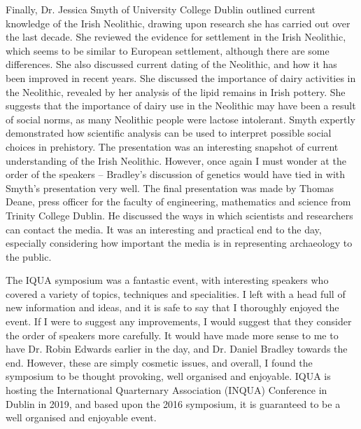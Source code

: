 \documentclass[%
	]{ijsra}
\begin{document}
Finally, Dr. Jessica Smyth of University College Dublin outlined current knowledge of the Irish Neolithic, drawing upon research she has carried out over the last decade. She reviewed the evidence for settlement in the Irish Neolithic, which seems to be similar to European settlement, although there are some differences. She also discussed current dating of the Neolithic, and how it has been improved in recent years. She discussed the importance of dairy activities in the Neolithic, revealed by her analysis of the lipid remains in Irish pottery. She suggests that the importance of dairy use in the Neolithic may have been a result of social norms, as many Neolithic people were lactose intolerant. Smyth expertly demonstrated how scientific analysis can be used to interpret possible social choices in prehistory. The presentation was an interesting snapshot of current understanding of the Irish Neolithic. However, once again I must wonder at the order of the speakers – Bradley’s discussion of genetics would have tied in with Smyth’s presentation very well. 
The final presentation was made by Thomas Deane, press officer for the faculty of engineering, mathematics and science from Trinity College Dublin. He discussed the ways in which scientists and researchers can contact the media. It was an interesting and practical end to the day, especially considering how important the media is in representing archaeology to the public. 

The IQUA symposium was a fantastic event, with interesting speakers who covered a variety of topics, techniques and specialities. I left with a head full of new information and ideas, and it is safe to say that I thoroughly enjoyed the event. If I were to suggest any improvements, I would suggest that they consider the order of speakers more carefully. It would have made more sense to me to have Dr. Robin Edwards earlier in the day, and Dr. Daniel Bradley towards the end. However, these are simply cosmetic issues, and overall, I found the symposium to be thought provoking, well organised and enjoyable. IQUA is hosting the International Quarternary Association (INQUA) Conference in Dublin in 2019, and based upon the 2016 symposium, it is guaranteed to be a well organised and enjoyable event. 

\IJSRAclosing%
\end{document}
